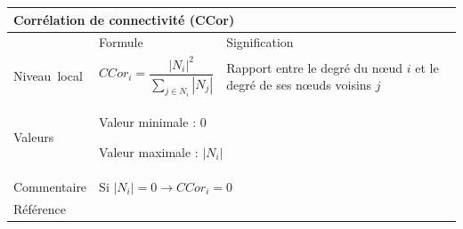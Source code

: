 \documentclass{article}
\begin{document}
\begin{table}[H]
\raggedright
\begin{tabular}{|m{3.24cm}|m{4.4810004cm}m{7.924cm}|}

\hline
\multicolumn{3}{|m{16.044998cm}|}{Corrélation de connectivité (CCor)}\\\hline
 &
\multicolumn{1}{m{4.4810004cm}|}{Formule} &
Signification\\\hline
Niveau~local 

 &
\multicolumn{1}{m{4.4810004cm}|}{\begin{equation*}
{\mathit{CCor}}_{i}=\frac{{\left|{N}_{i}\right|}^{2}}{\sum _{j{\in}{N}_{i}}{\left|{N}_{j}\right|}}
\end{equation*}
} &
Rapport entre le degré du nœud $i$ et le degré de ses nœuds voisins $j$\\\hline
Valeurs &
\multicolumn{2}{m{12.6050005cm}|}{Valeur minimale : 0

Valeur maximale :  $\left|{N}_{i}\right|$}\\\hline
Commentaire &
\multicolumn{2}{m{12.6050005cm}|}{Si  $\left|{N}_{i}\right|=0\rightarrow {\mathit{CCor}}_{i}=0$}\\\hline
Référence &
\multicolumn{2}{m{12.6050005cm}|}{\cite{Minor2008}}\\\hline
\end{tabular}
\end{table}

\pagebreak



\end{document}

